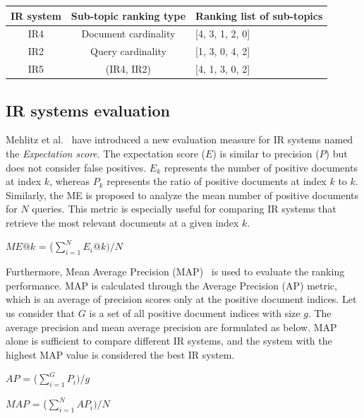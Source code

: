  
 
 \begin{center}
 	\label{tab:ir5_result}
 	\begin{tabularx}{0.8\textwidth}{|c|c|Y|}
 		\hline

 			IR system & Sub-topic ranking type & Ranking list of sub-topics \\
 		\hline
 		IR4 & Document cardinality  & [4, 3, 1, 2, 0] \\
 		\hline
 		IR2 & Query cardinality  & [1, 3, 0, 4, 2] \\
 		\hline
 		IR5 & (IR4, IR2) & [4, 1, 3, 0, 2] \\
 		\hline
 	\end{tabularx}
 \end{center}
 

\subsection{IR systems evaluation}

Mehlitz et al.~\cite{mehlitz2007new} have introduced a new evaluation measure for \ac{IR} systems named the \emph{Expectation score}. The expectation score ($E$) is similar to precision ($P$) but does not consider false positives. $E_k$ represents the number of positive documents at index $k$, whereas $P_k$ represents the ratio of positive documents at index $k$ to $k$. Similarly, the \ac{ME} is proposed to analyze the mean number of positive documents for $N$ queries. This metric is especially useful for comparing \ac{IR} systems that retrieve the most relevant documents at a given index $k$.



\centerline{$ME@k$ = ($\sum\limits_{i=1}^N E_i@k) /N$}

Furthermore, Mean Average Precision (MAP)~\cite{cormack2006statistical} is used to evaluate the ranking performance. MAP is calculated through the Average Precision (AP) metric, which is an average of precision scores only at the positive document indices. Let us consider that $G$ is a set of all positive document indices with size $g$. The average precision and mean average precision are formulated as below. MAP alone is sufficient to compare different \ac{IR} systems, and the system with the highest MAP value is considered the best \ac{IR} system.


\centerline{$AP$ = ($\sum\limits_{i=1}^G P_i) /g$}

\centerline{$MAP$ = ($\sum\limits_{i=1}^N AP_i) /N$}

